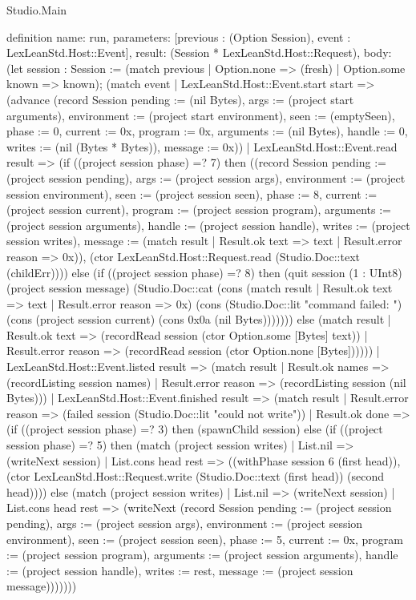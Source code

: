 \begin{lexlean}{Studio.Main}
\begin{semanticmodule}
definition{
  name: run,
  parameters: [previous : (Option Session), event : LexLeanStd.Host::Event],
  result: (Session * LexLeanStd.Host::Request),
  body: (let session : Session := (match previous
      | Option.none => (fresh)
      | Option.some known => known); (match event
    | LexLeanStd.Host::Event.start start => (advance (record Session {pending := (nil Bytes), args := (project start arguments), environment := (project start environment), seen := (emptySeen), phase := 0, current := 0x, program := 0x, arguments := (nil Bytes), handle := 0, writes := (nil (Bytes * Bytes)), message := 0x}))
    | LexLeanStd.Host::Event.read result => (if ((project session phase) =? 7) then ((record Session {pending := (project session pending), args := (project session args), environment := (project session environment), seen := (project session seen), phase := 8, current := (project session current), program := (project session program), arguments := (project session arguments), handle := (project session handle), writes := (project session writes), message := (match result
        | Result.ok text => text
        | Result.error reason => 0x)}), (ctor LexLeanStd.Host::Request.read (Studio.Doc::text (childErr)))) else (if ((project session phase) =? 8) then (quit session (1 : UInt8) (project session message) (Studio.Doc::cat (cons (match result
        | Result.ok text => text
        | Result.error reason => 0x) (cons (Studio.Doc::lit "command failed: ") (cons (project session current) (cons 0x0a (nil Bytes))))))) else (match result
        | Result.ok text => (recordRead session (ctor Option.some [Bytes] text))
        | Result.error reason => (recordRead session (ctor Option.none [Bytes])))))
    | LexLeanStd.Host::Event.listed result => (match result
      | Result.ok names => (recordListing session names)
      | Result.error reason => (recordListing session (nil Bytes)))
    | LexLeanStd.Host::Event.finished result => (match result
      | Result.error reason => (failed session (Studio.Doc::lit "could not write"))
      | Result.ok done => (if ((project session phase) =? 3) then (spawnChild session) else (if ((project session phase) =? 5) then (match (project session writes)
          | List.nil => (writeNext session)
          | List.cons head rest => ((withPhase session 6 (first head)), (ctor LexLeanStd.Host::Request.write (Studio.Doc::text (first head)) (second head)))) else (match (project session writes)
          | List.nil => (writeNext session)
          | List.cons head rest => (writeNext (record Session {pending := (project session pending), args := (project session args), environment := (project session environment), seen := (project session seen), phase := 5, current := 0x, program := (project session program), arguments := (project session arguments), handle := (project session handle), writes := rest, message := (project session message)}))))))
}
\end{semanticmodule}
\end{lexlean}
